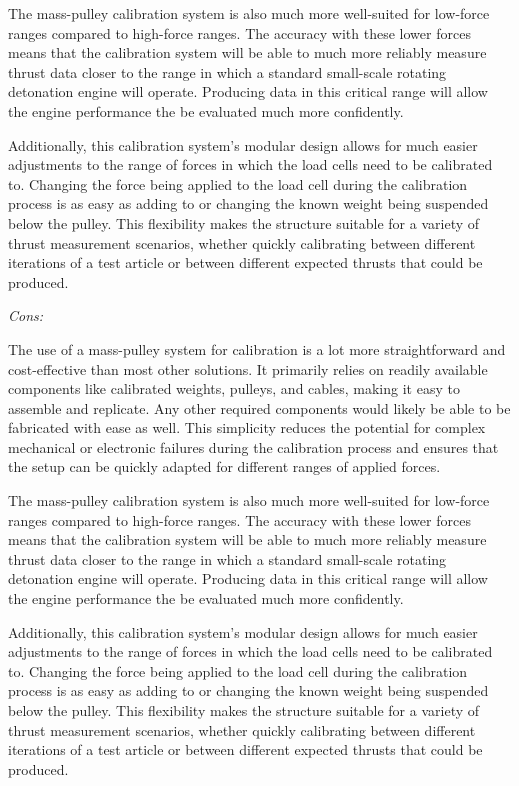 The mass-pulley calibration system is also much more well-suited for low-force ranges compared to high-force ranges. The accuracy with these lower forces means that the calibration system will be able to much more reliably measure thrust data closer to the range in which a standard small-scale rotating detonation engine will operate. Producing data in this critical range will allow the engine performance the be evaluated much more confidently.

Additionally, this calibration system’s modular design allows for much easier adjustments to the range of forces in which the load cells need to be calibrated to. Changing the force being applied to the load cell during the calibration process is as easy as adding to or changing the known weight being suspended below the pulley. This flexibility makes the structure suitable for a variety of thrust measurement scenarios, whether quickly calibrating between different iterations of a test article or between different expected thrusts that could be produced.

\noindent\textit{Cons:}

The use of a mass-pulley system for calibration is a lot more straightforward and cost-effective than most other solutions. It primarily relies on readily available components like calibrated weights, pulleys, and cables, making it easy to assemble and replicate. Any other required components would likely be able to be fabricated with ease as well. This simplicity reduces the potential for complex mechanical or electronic failures during the calibration process and ensures that the setup can be quickly adapted for different ranges of applied forces.

The mass-pulley calibration system is also much more well-suited for low-force ranges compared to high-force ranges. The accuracy with these lower forces means that the calibration system will be able to much more reliably measure thrust data closer to the range in which a standard small-scale rotating detonation engine will operate. Producing data in this critical range will allow the engine performance the be evaluated much more confidently.

Additionally, this calibration system’s modular design allows for much easier adjustments to the range of forces in which the load cells need to be calibrated to. Changing the force being applied to the load cell during the calibration process is as easy as adding to or changing the known weight being suspended below the pulley. This flexibility makes the structure suitable for a variety of thrust measurement scenarios, whether quickly calibrating between different iterations of a test article or between different expected thrusts that could be produced.

